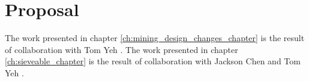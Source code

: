 \chapter{Proposal}
\label{ch:propsal}
The work presented in chapter \ref{ch:mining_design_changes_chapter} is the result of collaboration with Tom Yeh \cite{Alharbi_2015_MobileHCI}.
The work presented in chapter \ref{ch:sieveable_chapter} is the result of collaboration with Jackson Chen and Tom Yeh \cite{Alharbi_2015_VLDB}.